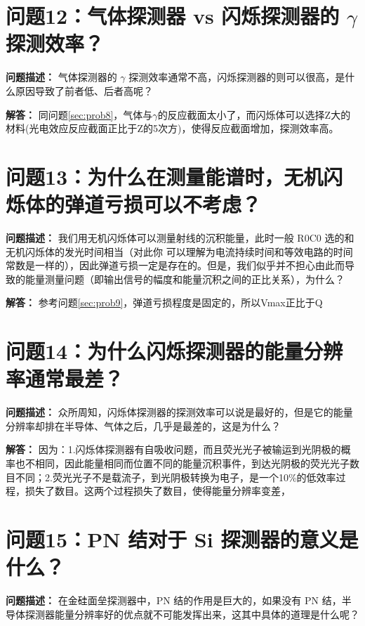 \documentclass{article}
\begin{document}
\section{问题12：气体探测器 vs 闪烁探测器的 $\gamma$ 探测效率？}
\label{sec:prob12}

\textbf{问题描述：} 气体探测器的 $\gamma$ 探测效率通常不高，闪烁探测器的则可以很高，是什么原因导致了前者低、后者高呢？

\textbf{解答：} 同问题\ref{sec:prob8}，气体与$\gamma$的反应截面太小了，而闪烁体可以选择Z大的材料(光电效应反应截面正比于Z的5次方)，使得反应截面增加，探测效率高。

\section{问题13：为什么在测量能谱时，无机闪烁体的弹道亏损可以不考虑？}
\label{sec:prob13}

\textbf{问题描述：} 我们用无机闪烁体可以测量射线的沉积能量，此时一般 R0C0 选的和无机闪烁体的发光时间相当（对此你 可以理解为电流持续时间和等效电路的时间常数是一样的），因此弹道亏损一定是存在的。但是，我们似乎并不担心由此而导致的能量测量问题（即输出信号的幅度和能量沉积之间的正比关系），为什么？

\textbf{解答：} 参考问题\ref{sec:prob9}，弹道亏损程度是固定的，所以Vmax正比于Q

\section{问题14：为什么闪烁探测器的能量分辨率通常最差？}
\label{sec:prob14}

\textbf{问题描述：} 众所周知，闪烁体探测器的探测效率可以说是最好的，但是它的能量分辨率却排在半导体、气体之后，几乎是最差的，这是为什么？

\textbf{解答：} 因为：1.闪烁体探测器有自吸收问题，而且荧光光子被输运到光阴极的概率也不相同，因此能量相同而位置不同的能量沉积事件，到达光阴极的荧光光子数目不同；2.荧光光子不是载流子，到光阴极转换为电子，是一个10\%的低效率过程，损失了数目。这两个过程损失了数目，使得能量分辨率变差，

\section{问题15：PN 结对于 Si 探测器的意义是什么？}
\label{sec:prob15}

\textbf{问题描述：} 在金硅面垒探测器中，PN 结的作用是巨大的，如果没有 PN 结，半导体探测器能量分辨率好的优点就不可能发挥出来，这其中具体的道理是什么呢？
\end{document}
